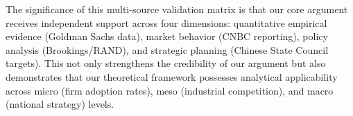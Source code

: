 The significance of this multi-source validation matrix is that our core argument receives independent support across four dimensions: quantitative empirical evidence (Goldman Sachs data), market behavior (CNBC reporting), policy analysis (Brookings/RAND), and strategic planning (Chinese State Council targets). This not only strengthens the credibility of our argument but also demonstrates that our theoretical framework possesses analytical applicability across micro (firm adoption rates), meso (industrial competition), and macro (national strategy) levels.
